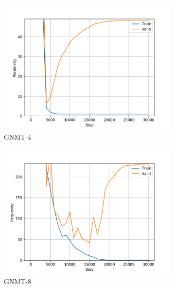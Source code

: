 \begin{figure}[H]
\begin{subfigure}{0.45\textwidth}
\includegraphics[width=\textwidth]{../results/lc-quad1/run1/wmt16_gnmt_4_layer/ppls.png} 
\caption{GNMT-4}
\label{fig:lcquad gnmt4 ppl}
\end{subfigure}
\hfill
\begin{subfigure}{0.45\textwidth}
\includegraphics[width=\textwidth]{../results/lc-quad1/run1/wmt16_gnmt_8_layer/ppls.png}
\caption{GNMT-8}
\label{fig:lcquad gnmt8 ppl}
\end{subfigure}
\hfill
\begin{subfigure}{0.45\textwidth}

\end{subfigure}
\end{figure}
